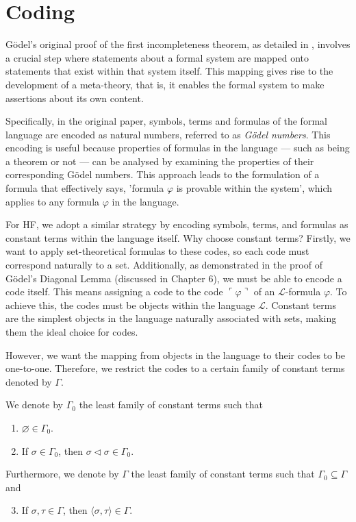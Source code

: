 \chapter{Coding}

Gödel's original proof of the first incompleteness theorem, 
as detailed in \cite{godel1931formal}, 
involves a crucial step where statements about a formal system are mapped onto statements that 
exist within that system itself. 
This mapping gives rise to the development of a meta-theory, that is, 
it enables the formal system to make assertions about its own content.

Specifically, in the original paper, symbols, terms and formulas of the formal language are encoded 
as natural numbers, referred to as \textit{Gödel numbers}. 
This encoding is useful because properties of formulas in the language 
— such as being a theorem or not — 
can be analysed by examining the properties of their corresponding Gödel numbers. 
This approach leads to the formulation of a formula that effectively says, 
'formula $\varphi$ is provable within the system', 
which applies to any formula $\varphi$ in the language.

For HF, we adopt a similar strategy by encoding symbols, terms, and formulas 
as constant terms within the language itself. Why choose constant terms?
Firstly, we want to apply set-theoretical formulas to these codes, 
so each code must correspond naturally to a set. 
Additionally, as demonstrated in the proof of Gödel’s Diagonal Lemma (discussed in Chapter 6), 
we must be able to encode a code itself. 
This means assigning a code to the code $\ulcorner{\varphi}\urcorner$ of an 
$\mathcal{L}$-formula $\varphi$. 
To achieve this, the codes must be objects within the language $\mathcal{L}$. 
Constant terms are the simplest objects in the language naturally associated with sets, 
making them the ideal choice for codes.

However, we want the mapping from objects in the language to their codes to be one-to-one.
Therefore, we restrict the codes to a certain family of constant terms denoted by $\Gamma$.

\begin{definition}
    \label{def:C.IsInΓ0+C.IsInΓ+Code}
    \leanok
    We denote by $\Gamma_0$ the least family of constant terms such that
    \begin{enumerate}
        \item $\varnothing \in \Gamma_0$.
        \item If $\sigma \in \Gamma_0$, then $\sigma \lhd \sigma \in \Gamma_0$.
    \end{enumerate}
    Furthermore, we denote by $\Gamma$ the least family of constant terms such that
    $\Gamma_0 \subseteq \Gamma$ and 
    \begin{enumerate}\setcounter{enumi}{2} %
        \item If $\sigma, \tau \in \Gamma$, then $\langle\sigma, \tau\rangle \in \Gamma$.
    \end{enumerate}
\end{definition}

